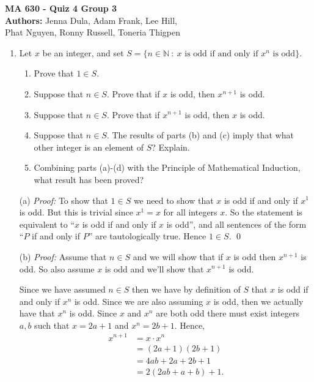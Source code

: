 \documentclass[12pt]{article}
\begin{document}
\pagestyle{empty} 
\begin{center}\noindent \textbf{\large MA 630 - Quiz 4 Group 3} \\[3mm]

\textbf{Authors: }Jenna Dula, Adam Frank, Lee Hill, \\
Phat Nguyen, Ronny Russell, Toneria Thigpen
\end{center}
\vspace{.1in}


\begin{enumerate}
\item Let $x$ be an integer, and set $S = \{n \in \mathbb{N} \ : \ x \text{ is odd if and only if } x^n \text{ is odd}\}$.
	\begin{enumerate}
	\item Prove that $1 \in S$.
	\item Suppose that $n \in S$. Prove that if $x$ is odd, then $x^{n+1}$ is odd.
	\item Suppose that $n \in S$. Prove that if $x^{n+1}$ is odd, then $x$ is odd.
	\item Suppose that $n \in S$. The results of parts (b) and (c) imply that what other integer is an element of $S$? Explain.
	\item Combining parts (a)-(d) with the Principle of Mathematical Induction, what result has been proved?
	\end{enumerate}
	
	(a) {\it Proof:} To show that $1\in S$ we need to show that $x$ is odd if and only if $x^1$ is odd.  But this is trivial since $x^1=x$ for all integers $x$.  So the statement is equivalent to ``$x$ is odd if and only if $x$ is odd'', and all sentences of the form ``$P$ if and only if $P$'' are tautologically true.  Hence $1\in S$. \qed
	
	(b) {\it Proof:} Assume that $n\in S$ and we will show that if $x$ is odd then $x^{n+1}$ is odd.  So also assume $x$ is odd and we'll show that $x^{n+1}$ is odd.  
	
	Since we have assumed $n\in S$ then we have by definition of $S$ that $x$ is odd if and only if $x^{n}$ is odd.  Since we are also assuming $x$ is odd, then we actually have that $x^n$ is odd.  Since $x$ and $x^n$ are both odd there must exist integers $a,b$ such that $x=2a+1$ and $x^n = 2b+1$.  Hence,
	\begin{align*}
	    x^{n+1} &= x\cdot x^n \\[.3cm]
	    &= (2a+1)(2b+1) \\[.3cm]
	    &= 4ab + 2a + 2b + 1 \\[.3cm]
	    &= 2(2ab+a+b)+1.
	\end{align*}
	

\end{enumerate}
\end{document}
